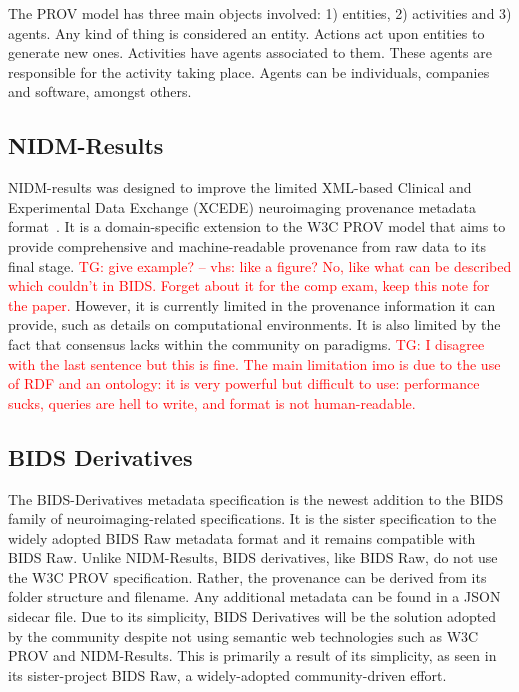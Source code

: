\documentclass{report}
\newcommand{\tristan}[1]{\textcolor{red}{TG: #1}}
\begin{document}
            The PROV model has three main objects involved: 1) entities, 2) 
            activities and 3) agents. Any kind of thing is considered an entity.
            Actions act upon entities to generate new ones. Activities have 
            agents associated to them. These agents are responsible for the 
            activity taking place. Agents can be individuals, companies and 
            software, amongst others.
            
            \subsection{NIDM-Results}
                NIDM-results was designed to improve the limited XML-based 
                Clinical and Experimental Data Exchange (XCEDE) neuroimaging
                provenance metadata format~\cite{Maumet:2016aa}. It is a domain-specific extension
                to the W3C PROV model that aims to provide comprehensive and
                machine-readable provenance from raw data to its final stage. \tristan{give example? -- vhs: like a figure? No, like what can be described which couldn't in BIDS. 
                Forget about it for the comp exam, keep this note for the paper.}
                However, it is currently limited in the provenance 
                information it can provide, such as details on computational 
                environments. It is also limited by the fact that consensus lacks
                within the community on paradigms. \tristan{I disagree with the last sentence
                but this is fine. The main limitation imo is due to the use of RDF and an ontology: it is
                very powerful but difficult to use: performance sucks, queries are hell to write, 
                and format is not human-readable.}

            \subsection{BIDS Derivatives}
                The BIDS-Derivatives metadata specification is the newest 
                addition to the BIDS family of neuroimaging-related 
                specifications. It is the sister
                specification to the widely adopted BIDS Raw metadata format 
                and it remains compatible with BIDS Raw. 
                Unlike NIDM-Results, BIDS derivatives, like BIDS Raw, do not
                use the W3C PROV specification. Rather, the provenance can be
                derived from its folder structure and filename. Any additional
                metadata can be found in a JSON sidecar file. Due to its simplicity,
                BIDS Derivatives will be the solution adopted by the community 
                despite not using semantic web technologies such as W3C PROV and NIDM-Results.
                This is primarily a result of its simplicity, as seen in its 
                sister-project BIDS Raw, a widely-adopted community-driven effort.
            
\end{document}
